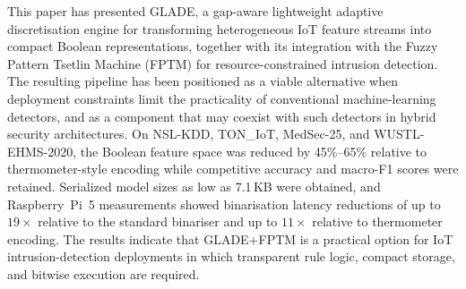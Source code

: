 \documentclass[journal,twoside,web]{ieeecolor}
\begin{document}
This paper has presented GLADE, a gap-aware lightweight adaptive
discretisation engine for transforming heterogeneous IoT feature
streams into compact Boolean representations, together with its
integration with the Fuzzy Pattern Tsetlin Machine (FPTM) for
resource-constrained intrusion detection. The resulting pipeline has
been positioned as a viable alternative when deployment constraints
limit the practicality of conventional machine-learning detectors, and
as a component that may coexist with such detectors in hybrid security
architectures. On NSL-KDD, TON\_IoT, MedSec-25, and WUSTL-EHMS-2020,
the Boolean feature space was reduced by 45\%--65\% relative to
thermometer-style encoding while competitive accuracy and macro-F1
scores were retained. Serialized model sizes as low as 7.1\,KB were
obtained, and Raspberry~Pi~5 measurements showed binarisation latency
reductions of up to $19\times$ relative to the standard binariser and
up to $11\times$ relative to thermometer encoding. The results indicate
that GLADE+FPTM is a practical option for IoT intrusion-detection
deployments in which transparent rule logic, compact storage, and
bitwise execution are required.



\end{document}
